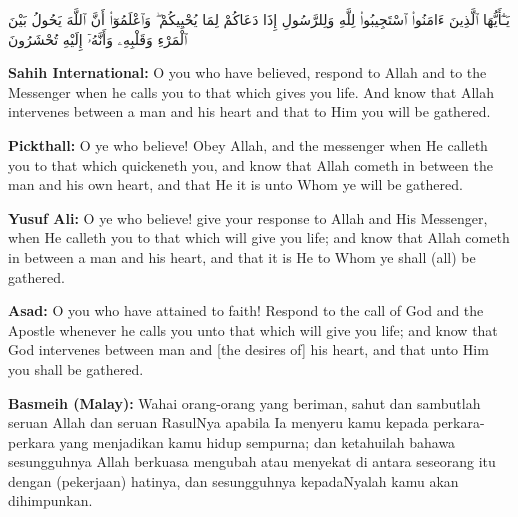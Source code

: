 \documentclass[11pt,a4paper,openany]{book}
\let\textAR\textarabic
\newcommand{\quranverse}[1]{{\centering\Large\textAR{#1}\par}}
\begin{document}
\begin{quranbox}[Qur'an 8:24]
\quranverse{يَـٰٓأَيُّهَا ٱلَّذِينَ ءَامَنُوا۟ ٱسْتَجِيبُوا۟ لِلَّهِ وَلِلرَّسُولِ إِذَا دَعَاكُمْ لِمَا يُحْيِيكُمْ ۖ وَٱعْلَمُوٓا۟ أَنَّ ٱللَّهَ يَحُولُ بَيْنَ ٱلْمَرْءِ وَقَلْبِهِۦ وَأَنَّهُۥٓ إِلَيْهِ تُحْشَرُونَ}

\vspace{6pt}
\noindent\textbf{Sahih International:} O you who have believed, respond to Allah and to the Messenger when he calls you to that which gives you life. And know that Allah intervenes between a man and his heart and that to Him you will be gathered.

\vspace{4pt}
\noindent\textbf{Pickthall:} O ye who believe! Obey Allah, and the messenger when He calleth you to that which quickeneth you, and know that Allah cometh in between the man and his own heart, and that He it is unto Whom ye will be gathered.

\vspace{4pt}
\noindent\textbf{Yusuf Ali:} O ye who believe! give your response to Allah and His Messenger, when He calleth you to that which will give you life; and know that Allah cometh in between a man and his heart, and that it is He to Whom ye shall (all) be gathered.

\vspace{4pt}
\noindent\textbf{Asad:} O you who have attained to faith! Respond to the call of God and the Apostle whenever he calls you unto that which will give you life; and know that God intervenes between man and [the desires of] his heart, and that unto Him you shall be gathered.

\vspace{4pt}
\noindent\textbf{Basmeih (Malay):} Wahai orang-orang yang beriman, sahut dan sambutlah seruan Allah dan seruan RasulNya apabila Ia menyeru kamu kepada perkara-perkara yang menjadikan kamu hidup sempurna; dan ketahuilah bahawa sesungguhnya Allah berkuasa mengubah atau menyekat di antara seseorang itu dengan (pekerjaan) hatinya, dan sesungguhnya kepadaNyalah kamu akan dihimpunkan.
\end{quranbox}
\end{document}
